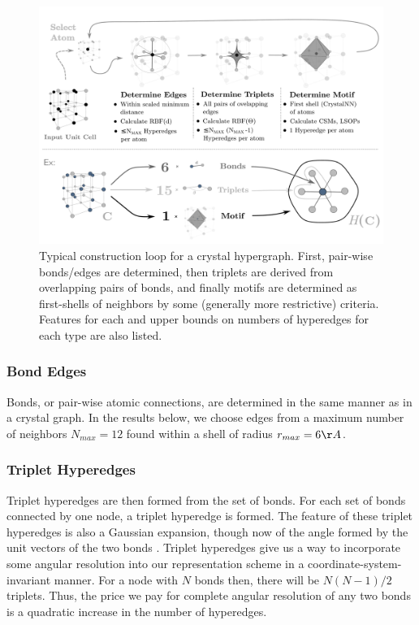 \documentclass[twoside,twocolumn,9pt]{article}
\begin{document}
\begin{figure}[!ht]
	\centering
	\includegraphics[scale=0.31]{crystal_hgraph_ex+revamp3.pdf}
	\caption{Typical construction loop for a crystal hypergraph. First, pair-wise bonds/edges are determined, then triplets are derived from overlapping pairs of bonds, and finally motifs are determined as first-shells of neighbors by some (generally more restrictive) criteria. Features for each and upper bounds on numbers of hyperedges for each type are also listed.}
	\label{fig:hypergraph-loop}
\end{figure}

\subsubsection{Bond Edges}
Bonds, or pair-wise atomic connections, are determined in the same manner as in a crystal graph. In the results below, we choose edges from a maximum number of neighbors $N_{max}=12$ found within a shell of radius $r_{max}=6\AA$. 

\subsubsection{Triplet Hyperedges}
Triplet hyperedges are then formed from the set of bonds. For each set of bonds connected by one node, a triplet hyperedge is formed. The feature of these triplet hyperedges is also a Gaussian expansion, though now of the angle formed by the unit vectors of the two bonds \cite{alignn}.
Triplet hyperedges give us a way to incorporate some angular resolution into our representation scheme in a coordinate-system-invariant manner.
For a node with $N$ bonds then, there will be $N(N-1)/2$ triplets. Thus, the price we pay for complete angular resolution of any two bonds is a quadratic increase in the number of hyperedges.
\end{document}
